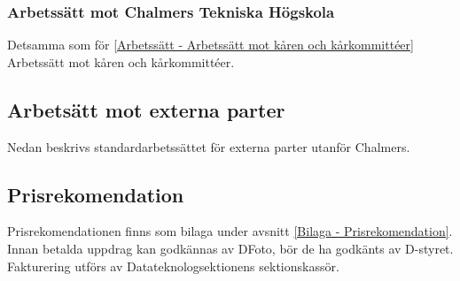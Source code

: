\subsubsection{Arbetssätt mot Chalmers Tekniska Högskola}
Detsamma som för \ref{Arbetssätt - Arbetssätt mot kåren och kårkommittéer} Arbetssätt mot kåren och kårkommittéer. 

\subsection{Arbetsätt mot externa parter}
Nedan beskrivs standardarbetssättet för externa parter utanför Chalmers. 

\subsection{Prisrekomendation}
\label{Prisrekomendation}
Prisrekomendationen finns som bilaga under avsnitt \ref{Bilaga - Prisrekomendation}.  Innan betalda uppdrag kan godkännas av DFoto, bör de ha godkänts av D-styret. Fakturering utförs av Datateknologsektionens sektionskassör. 
